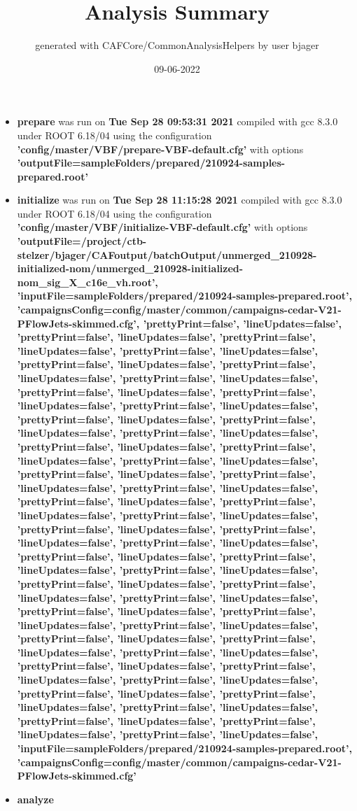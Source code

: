 \documentclass{article}
\title{Analysis Summary}
\author{generated with CAFCore/CommonAnalysisHelpers by user bjager}
\date{09-06-2022}
\begin{document}
\maketitle
\tableofcontents

\begin{itemize}
\item \textbf{prepare} was run on \textbf{Tue Sep 28 09:53:31 2021} compiled with gcc 8.3.0 under ROOT 6.18/04 using the configuration \textbf{'config/master/VBF/prepare-VBF-default.cfg'} with options \textbf{'outputFile=sampleFolders/prepared/210924-samples-prepared.root'} \item \textbf{initialize} was run on \textbf{Tue Sep 28 11:15:28 2021} compiled with gcc 8.3.0 under ROOT 6.18/04 using the configuration \textbf{'config/master/VBF/initialize-VBF-default.cfg'} with options \textbf{'outputFile=/project/ctb-stelzer/bjager/CAFoutput/batchOutput/unmerged\_210928-initialized-nom/unmerged\_210928-initialized-nom\_sig\_X\_c16e\_vh.root', 'inputFile=sampleFolders/prepared/210924-samples-prepared.root', 'campaignsConfig=config/master/common/campaigns-cedar-V21-PFlowJets-skimmed.cfg', 'prettyPrint=false', 'lineUpdates=false', 'prettyPrint=false', 'lineUpdates=false', 'prettyPrint=false', 'lineUpdates=false', 'prettyPrint=false', 'lineUpdates=false', 'prettyPrint=false', 'lineUpdates=false', 'prettyPrint=false', 'lineUpdates=false', 'prettyPrint=false', 'lineUpdates=false', 'prettyPrint=false', 'lineUpdates=false', 'prettyPrint=false', 'lineUpdates=false', 'prettyPrint=false', 'lineUpdates=false', 'prettyPrint=false', 'lineUpdates=false', 'prettyPrint=false', 'lineUpdates=false', 'prettyPrint=false', 'lineUpdates=false', 'prettyPrint=false', 'lineUpdates=false', 'prettyPrint=false', 'lineUpdates=false', 'prettyPrint=false', 'lineUpdates=false', 'prettyPrint=false', 'lineUpdates=false', 'prettyPrint=false', 'lineUpdates=false', 'prettyPrint=false', 'lineUpdates=false', 'prettyPrint=false', 'lineUpdates=false', 'prettyPrint=false', 'lineUpdates=false', 'prettyPrint=false', 'lineUpdates=false', 'prettyPrint=false', 'lineUpdates=false', 'prettyPrint=false', 'lineUpdates=false', 'prettyPrint=false', 'lineUpdates=false', 'prettyPrint=false', 'lineUpdates=false', 'prettyPrint=false', 'lineUpdates=false', 'prettyPrint=false', 'lineUpdates=false', 'prettyPrint=false', 'lineUpdates=false', 'prettyPrint=false', 'lineUpdates=false', 'prettyPrint=false', 'lineUpdates=false', 'prettyPrint=false', 'lineUpdates=false', 'prettyPrint=false', 'lineUpdates=false', 'prettyPrint=false', 'lineUpdates=false', 'prettyPrint=false', 'lineUpdates=false', 'prettyPrint=false', 'lineUpdates=false', 'prettyPrint=false', 'lineUpdates=false', 'prettyPrint=false', 'lineUpdates=false', 'prettyPrint=false', 'lineUpdates=false', 'prettyPrint=false', 'lineUpdates=false', 'prettyPrint=false', 'lineUpdates=false', 'prettyPrint=false', 'lineUpdates=false', 'prettyPrint=false', 'lineUpdates=false', 'prettyPrint=false', 'lineUpdates=false', 'prettyPrint=false', 'lineUpdates=false', 'prettyPrint=false', 'lineUpdates=false', 'inputFile=sampleFolders/prepared/210924-samples-prepared.root', 'campaignsConfig=config/master/common/campaigns-cedar-V21-PFlowJets-skimmed.cfg'} \item \textbf{analyze} 
\end{itemize}
\end{document}
